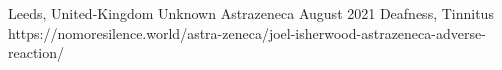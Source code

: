           {Leeds, United-Kingdom}
          {Unknown}
          {Astrazeneca}
          {August 2021}
          {Deafness, Tinnitus}
          {https://nomoresilence.world/astra-zeneca/joel-isherwood-astrazeneca-adverse-reaction/}


